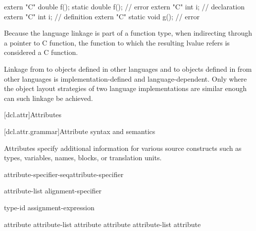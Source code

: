 \begin{codeblock}
extern "C" double f();
static double f();                  // error
extern "C" int i;                   // declaration
extern "C" {
  int i;                            // definition
}
extern "C" static void g();         // error
\end{codeblock}
\exitexample

\pnum
\enternote
Because the language linkage is part of a function type, when
indirecting through a pointer to C function, the function to
which the resulting lvalue refers is considered a C function.
\exitnote

\pnum
{}%
%
Linkage from \Cpp to objects defined in other languages and to objects
defined in \Cpp from other languages is implemen\-tation-defined and
language-dependent. Only where the object layout strategies of two
language implementations are similar enough can such linkage be
achieved.%

[dcl.attr]{Attributes}%

[dcl.attr.grammar]{Attribute syntax and semantics}

\pnum
{}%
Attributes specify additional information for various source constructs
such as types, variables, names, blocks, or translation units.

\begin{bnf}
\br
  attribute-specifier-seq\opt attribute-specifier
\end{bnf}

\begin{bnf}
\br
  \terminal{[} \terminal{[} attribute-list \terminal{]} \terminal{]}\br
  alignment-specifier
\end{bnf}

\begin{bnf}
\br
   type-id \opt \terminal{)}\br
   assignment-expression \opt \terminal{)}
\end{bnf}

\begin{bnf}
\br
  attribute\opt\br
  attribute-list \terminal{,} attribute\opt\br
  attribute \br
  attribute-list \terminal{,} attribute 
\end{bnf}

